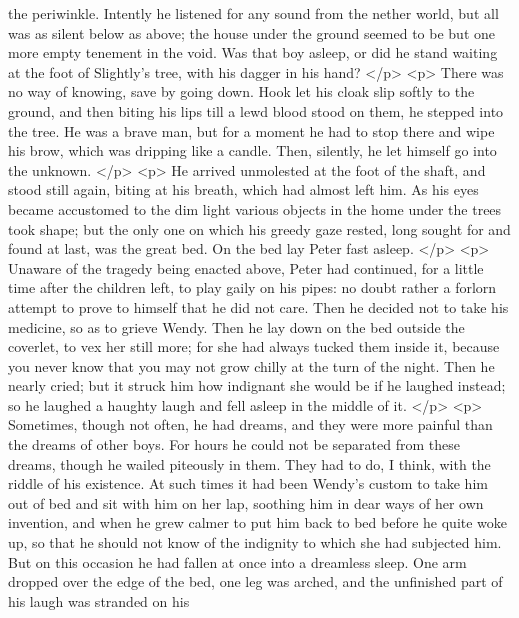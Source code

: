       the periwinkle. Intently he listened for any sound from the nether world,
      but all was as silent below as above; the house under the ground seemed to
      be but one more empty tenement in the void. Was that boy asleep, or did he
      stand waiting at the foot of Slightly's tree, with his dagger in his hand?
    </p>
    <p>
      There was no way of knowing, save by going down. Hook let his cloak slip
      softly to the ground, and then biting his lips till a lewd blood stood on
      them, he stepped into the tree. He was a brave man, but for a moment he
      had to stop there and wipe his brow, which was dripping like a candle.
      Then, silently, he let himself go into the unknown.
    </p>
    <p>
      He arrived unmolested at the foot of the shaft, and stood still again,
      biting at his breath, which had almost left him. As his eyes became
      accustomed to the dim light various objects in the home under the trees
      took shape; but the only one on which his greedy gaze rested, long sought
      for and found at last, was the great bed. On the bed lay Peter fast
      asleep.
    </p>
    <p>
      Unaware of the tragedy being enacted above, Peter had continued, for a
      little time after the children left, to play gaily on his pipes: no doubt
      rather a forlorn attempt to prove to himself that he did not care. Then he
      decided not to take his medicine, so as to grieve Wendy. Then he lay down
      on the bed outside the coverlet, to vex her still more; for she had always
      tucked them inside it, because you never know that you may not grow chilly
      at the turn of the night. Then he nearly cried; but it struck him how
      indignant she would be if he laughed instead; so he laughed a haughty
      laugh and fell asleep in the middle of it.
    </p>
    <p>
      Sometimes, though not often, he had dreams, and they were more painful
      than the dreams of other boys. For hours he could not be separated from
      these dreams, though he wailed piteously in them. They had to do, I think,
      with the riddle of his existence. At such times it had been Wendy's custom
      to take him out of bed and sit with him on her lap, soothing him in dear
      ways of her own invention, and when he grew calmer to put him back to bed
      before he quite woke up, so that he should not know of the indignity to
      which she had subjected him. But on this occasion he had fallen at once
      into a dreamless sleep. One arm dropped over the edge of the bed, one leg
      was arched, and the unfinished part of his laugh was stranded on his
